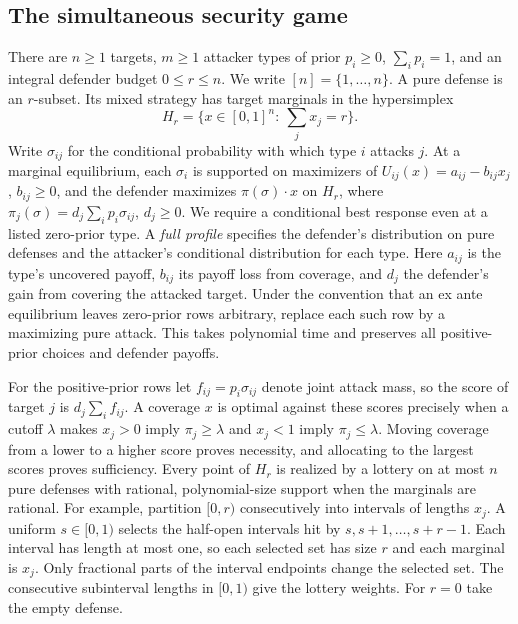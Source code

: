 \documentclass[11pt]{article}
\begin{document}
\subsection{The simultaneous security game}
There are \(n\ge1\) targets, \(m\ge1\) attacker types of prior
\(p_i\ge0\), \(\sum_i p_i=1\), and an integral defender budget \(0\le r\le n\).
We write \([n]=\{1,\ldots,n\}\).
A pure defense is an \(r\)-subset. Its mixed strategy has target marginals
in the hypersimplex
\[
 H_r=\{x\in[0,1]^n:\ \textstyle\sum_jx_j=r\}.
\]
Write \(\sigma_{ij}\) for the conditional probability with which type \(i\)
attacks \(j\). At a marginal equilibrium, each \(\sigma_i\) is supported on
maximizers of \(U_{ij}(x)=a_{ij}-b_{ij}x_j\), \(b_{ij}\ge0\), and the
defender maximizes \(\pi(\sigma)\cdot x\) on \(H_r\), where
\(\pi_j(\sigma)=d_j\sum_i p_i\sigma_{ij}\), \(d_j\ge0\). We require a
conditional best response even at a listed zero-prior type. A \emph{full
profile} specifies the defender's distribution on pure defenses and the
attacker's conditional distribution for each type. Here \(a_{ij}\) is the
type's uncovered payoff, \(b_{ij}\) its payoff loss from coverage, and
\(d_j\) the defender's gain from covering the attacked target.
Under the convention that an ex ante equilibrium leaves zero-prior rows
arbitrary, replace each such row by a maximizing pure attack. This takes
polynomial time and preserves all positive-prior choices and defender payoffs.

For the positive-prior rows let \(f_{ij}=p_i\sigma_{ij}\) denote joint
attack mass, so the score of target \(j\) is \(d_j\sum_i f_{ij}\).
A coverage \(x\) is optimal against these scores precisely when a cutoff
\(\lambda\) makes \(x_j>0\) imply \(\pi_j\ge\lambda\) and \(x_j<1\)
imply \(\pi_j\le\lambda\). Moving coverage from a lower to a higher
score proves necessity, and allocating to the largest scores proves
sufficiency. Every point of \(H_r\) is realized by a lottery on at most
\(n\) pure defenses with rational, polynomial-size support when the
marginals are rational. For example, partition \([0,r)\) consecutively
into intervals of lengths \(x_j\). A uniform \(s\in[0,1)\) selects the
half-open intervals hit by \(s,s+1,\ldots,s+r-1\). Each interval has
length at most one, so each selected set has size \(r\) and each marginal is \(x_j\).
Only fractional parts of the interval endpoints change the selected set.
The consecutive subinterval lengths in \([0,1)\) give the lottery weights.
For \(r=0\) take the empty defense.
\end{document}
